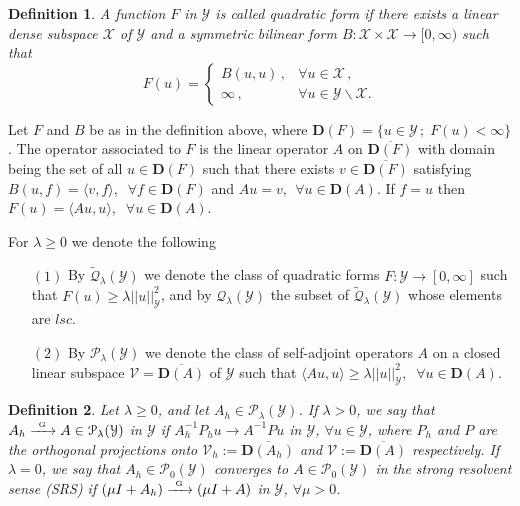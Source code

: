 \documentclass[11pt, epsf]{amsart}
\newtheorem{Def}{Definition}
\begin{document}
\begin{Def}
\emph{
A function $F$ in $\mathcal{Y}$ is called quadratic form if there exists a linear dense subspace $\mathcal{X}$ of $\mathcal{Y}$
and a symmetric bilinear form $B:\mathcal{X}\times \mathcal{X}\to[0,\infty)$ such that
$$
F(u)=\left\{ \begin{array}{ll}
B(u,u)\, ,&\forall u\in \mathcal{X}\, ,\\
\infty\, ,&\forall u\in\mathcal{Y}\backslash \mathcal{X}.
\end{array}\right.
$$
}
\end{Def}

Let $F$ and $B$ be as in the definition above, where $\mathbf{D}(F)=\{u\in\mathcal{Y}\,;\;F(u)<\infty\}$. The
operator associated to $F$ is the linear operator $A$ on $\overline{\mathbf{D}(F)}$ with domain being the set of
all $u\in \mathbf{D}(F)$ such that there exists $v\in \overline{\mathbf{D}(F)}$ satisfying $B(u,f)=\langle v,f\rangle,\;\;\forall f\in \mathbf{D}(F)$ and $Au=v$, $\;\forall u\in \mathbf{D}(A)$. If $f=u$
then $F(u)=\langle Au,u\rangle,\;\;\forall u\in \mathbf{D}(A)$.

For $\lambda\geq0$ we denote the following
\begin{itemize}
\item [$(1)$] By $\widetilde{\mathcal{Q}}_\lambda (\mathcal{Y})$ we denote the class of quadratic forms $F:\mathcal{Y}\to[0,\infty]$
such that $F(u)\geq\lambda ||u||^2_\mathcal{Y}$, and by $\mathcal{Q}_\lambda (\mathcal{Y})$ the subset of $\widetilde{\mathcal{Q}}_\lambda (\mathcal{Y})$
whose elements are $lsc$.
\item [$(2)$] By $\mathcal{P}_\lambda (\mathcal{Y})$ we denote the class of self-adjoint operators $A$ on a closed linear
subspace $\mathscr{V}=\overline{\mathbf{D}(A)}$ of $\mathcal{Y}$ such that $\langle Au,u\rangle\geq\lambda ||u||^2_\mathcal{Y},\;\; \forall u\in \mathbf{D}(A)$.
\end{itemize}
\begin{Def}
\emph{
Let $\lambda\geq0$, and let $A_h\in\mathcal{P}_\lambda(\mathcal{Y})$. If $\lambda>0$, we say that $A_h\xrightarrow[]{\;\,\text{\tiny G}\;\,}A\in\mathcal{P}_\lambda(\mathcal{Y})$ in $\mathcal{Y}$ if $A_h^{-1}P_hu\to A^{-1}P u$ in $\mathcal{Y}$, $\forall u\in \mathcal{Y}$, where $P_h$ and $P$ are the orthogonal projections onto $\mathscr{V}_h:=\overline{\mathbf{D}(A_h)}$ and  $\mathscr{V}:=\overline{\mathbf{D}(A)}$ respectively. If $\lambda=0$, we say that $A_h\in\mathcal{P}_0(\mathcal{Y})$ converges to $A\in\mathcal{P}_0(\mathcal{Y})$ in the strong resolvent sense (SRS) if $(\mu I+A_h)\xrightarrow[]{\;\,\text{\tiny G}\;\,}(\mu I+A)$ in $\mathcal{Y}$, $\forall\mu>0$.
}
\end{Def}
\end{document}
